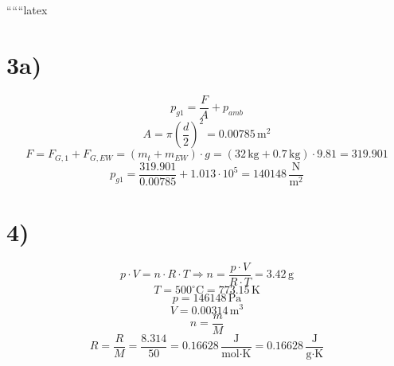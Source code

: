 
``````latex


\section*{3a)}
\begin{equation*}
    p_{g1} = \frac{F}{A} + p_{amb}
\end{equation*}
\begin{equation*}
    A = \pi \left( \frac{d}{2} \right)^2 = 0.00785 \, \text{m}^2
\end{equation*}
\begin{equation*}
    F = F_{G,1} + F_{G,EW} = (m_t + m_{EW}) \cdot g = (32 \, \text{kg} + 0.7 \, \text{kg}) \cdot 9.81 = 319.901
\end{equation*}
\begin{equation*}
    p_{g1} = \frac{319.901}{0.00785} + 1.013 \cdot 10^5 = 140148 \, \frac{\text{N}}{\text{m}^2}
\end{equation*}

\section*{4)}
\begin{equation*}
    p \cdot V = n \cdot R \cdot T \Rightarrow n = \frac{p \cdot V}{R \cdot T} = 3.42 \, \text{g}
\end{equation*}
\begin{equation*}
    T = 500^\circ \text{C} = 773.15 \, \text{K}
\end{equation*}
\begin{equation*}
    p = 146148 \, \text{Pa}
\end{equation*}
\begin{equation*}
    V = 0.00314 \, \text{m}^3
\end{equation*}
\begin{equation*}
    n = \frac{m}{M}
\end{equation*}
\begin{equation*}
    R = \frac{R}{M} = \frac{8.314}{50} = 0.16628 \, \frac{\text{J}}{\text{mol} \cdot \text{K}} = 0.16628 \, \frac{\text{J}}{\text{g} \cdot \text{K}}
\end{equation*}

